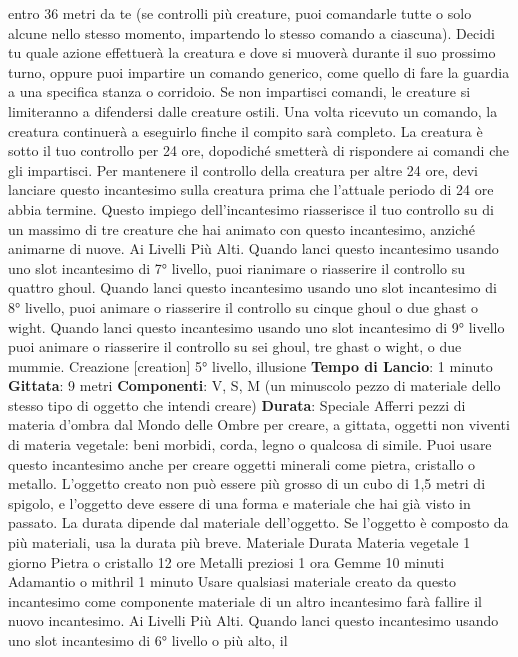 \begin{multicols}{2}
entro 36 metri da te (se controlli più creature, puoi
comandarle tutte o solo alcune nello stesso momento,
impartendo lo stesso comando a ciascuna). Decidi tu
quale azione effettuerà la creatura e dove si muoverà
durante il suo prossimo turno, oppure puoi impartire un
comando generico, come quello di fare la guardia a una
specifica stanza o corridoio. Se non impartisci comandi,
le creature si limiteranno a difendersi dalle creature
ostili. Una volta ricevuto un comando, la creatura
continuerà a eseguirlo finche il compito sarà completo.
La creatura è sotto il tuo controllo per 24 ore, dopodiché
smetterà di rispondere ai comandi che gli impartisci.
Per mantenere il controllo della creatura per altre 24
ore, devi lanciare questo incantesimo sulla creatura
prima che l’attuale periodo di 24 ore abbia termine.
Questo impiego dell’incantesimo riasserisce il tuo
controllo su di un massimo di tre creature che hai
animato con questo incantesimo, anziché animarne di
nuove.
Ai Livelli Più Alti. Quando lanci questo incantesimo
usando uno slot incantesimo di 7° livello, puoi rianimare
o riasserire il controllo su quattro ghoul. Quando lanci
questo incantesimo usando uno slot incantesimo di 8°
livello, puoi animare o riasserire il controllo su cinque
ghoul o due ghast o wight. Quando lanci questo
incantesimo usando uno slot incantesimo di 9° livello
puoi animare o riasserire il controllo su sei ghoul, tre
ghast o wight, o due mummie.
Creazione
[creation]
5° livello, illusione
\textbf{Tempo di Lancio}: 1 minuto
\textbf{Gittata}: 9 metri
\textbf{Componenti}: V, S, M (un minuscolo pezzo di materiale
dello stesso tipo di oggetto che intendi creare)
\textbf{Durata}: Speciale
Afferri pezzi di materia d’ombra dal Mondo delle Ombre
per creare, a gittata, oggetti non viventi di materia
vegetale: beni morbidi, corda, legno o qualcosa di
simile. Puoi usare questo incantesimo anche per creare
oggetti minerali come pietra, cristallo o metallo.
L’oggetto creato non può essere più grosso di un cubo
di 1,5 metri di spigolo, e l’oggetto deve essere di una
forma e materiale che hai già visto in passato.
La durata dipende dal materiale dell’oggetto. Se
l’oggetto è composto da più materiali, usa la durata più
breve.
Materiale Durata
Materia vegetale 1 giorno
Pietra o cristallo 12 ore
Metalli preziosi 1 ora
Gemme 10 minuti
Adamantio o mithril 1 minuto
Usare qualsiasi materiale creato da questo incantesimo
come componente materiale di un altro incantesimo
farà fallire il nuovo incantesimo.
Ai Livelli Più Alti. Quando lanci questo incantesimo
usando uno slot incantesimo di 6° livello o più alto, il

\end{multicols}
